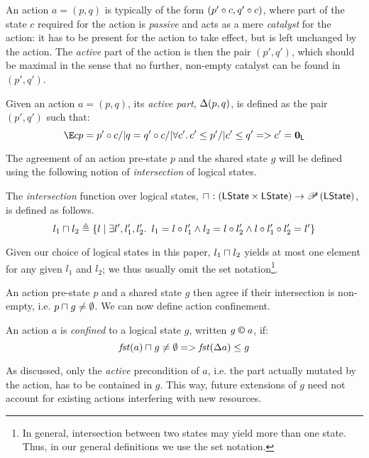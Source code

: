An action $a = (p, q)$ is typically of the form $(p' \circ c, q' \circ c)$, where part of the state $c$ required for the action is \emph{passive} and acts as a mere \emph{catalyst} for the action: it has to be present for the action to take effect, but is left unchanged by the action. The \emph{active} part of the action is then the pair $(p',q')$, which should be maximal in the sense that no further, non-empty catalyst can be found in $(p',q')$.
%
%
\begin{definition}
Given an action $a = (p, q)$, its \emph{active part}, $\Delta {(p,q)}$, is defined as the pair $(p', q')$ such that:
%
\[
	\E c p = p' \composeL c /| q = q' \composeL c /| \V{c'} c'\leq p' /|
  c'\leq q' => c' = \unitL
\]
%
\end{definition}
%
%
%
%
The agreement of an action pre-state $p$ and the shared state $g$ will be defined using the following notion of \emph{intersection} of logical states.
%
%
\begin{definition}[Intersection]
The \emph{intersection} function over logical states,
$
\sqcap_{} : \left(\mathsf{LState} \times \mathsf{LState} \right) \rightarrow \mathscr{P}\left(\mathsf{LState} \right)
$, is defined as follows.
%
\[
	l_1 \sqcap_{} l_2 \triangleq 
	\left\{ 
		l  \mid
		\exists l', l_1', l_2'.\,\ l_1 = l \circ l_1' \land l_2 = l \circ l_2' \land l \circ l_1' \circ l_2' = l'
	\right\}
\]
%
\end{definition}
%
Given our choice of logical states in this paper, $l_1\sqcap_{} l_2$ yields at most one element for any given $l_1$ and $l_2$; we thus usually omit the set notation\footnote{In general, 
intersection between two states may yield more than one state. Thus, in our general definitions we use the set notation.}.
%

An action pre-state $p$ and a shared state $g$ then agree if their intersection is non-empty, i.e. $p \sqcap_{} g \not= \emptyset$. We can now define action confinement.
%
%
\begin{definition}\label{def:actconf}
An action $a$ is \emph{confined} to a logical state $g$, written $g\containI a$, if:
%
\[
	\mathit{fst}(a)\sqcap_{} g \neq\emptyset => \mathit{fst}(\Delta {a})\leq g 
\]
\end{definition}
%
As discussed, only the \emph{active} precondition of $a$, i.e. the part actually mutated by the action, has to be contained in $g$. This way, future extensions of $g$ need not account for existing actions interfering with new resources.

